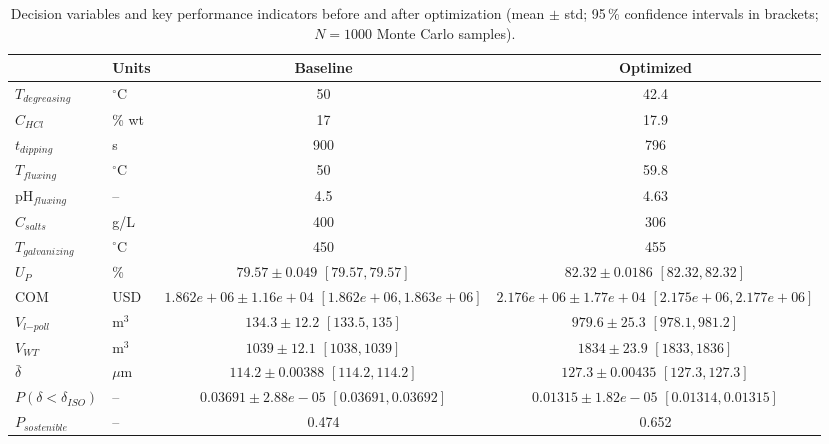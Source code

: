 \begin{table}[htbp]
\centering
\caption{Decision variables and key performance indicators before and after optimization (mean $\pm$ std; 95\,\% confidence intervals in brackets; $N = 1000$ Monte Carlo samples).}
\label{tab:summary}
\begin{tabular}{llcc}
\toprule
 & Units & Baseline & Optimized \\
\midrule
$T_{degreasing}$ & $^{\circ}$C & 50 & 42.4 \\
$C_{HCl}$ & \% wt & 17 & 17.9 \\
$t_{dipping}$ & s & 900 & 796 \\
$T_{fluxing}$ & $^{\circ}$C & 50 & 59.8 \\
pH$_{fluxing}$ & -- & 4.5 & 4.63 \\
$C_{salts}$ & g/L & 400 & 306 \\
$T_{galvanizing}$ & $^{\circ}$C & 450 & 455 \\
\midrule
$U_P$ & \% & $79.57 \pm 0.049$ $[79.57, 79.57]$ & $82.32 \pm 0.0186$ $[82.32, 82.32]$ \\
COM & USD & $1.862e+06 \pm 1.16e+04$ $[1.862e+06, 1.863e+06]$ & $2.176e+06 \pm 1.77e+04$ $[2.175e+06, 2.177e+06]$ \\
$V_{l\mathrm{-}poll}$ & m$^3$ & $134.3 \pm 12.2$ $[133.5, 135]$ & $979.6 \pm 25.3$ $[978.1, 981.2]$ \\
$V_{WT}$ & m$^3$ & $1039 \pm 12.1$ $[1038, 1039]$ & $1834 \pm 23.9$ $[1833, 1836]$ \\
$\bar{\delta}$ & $\mu$m & $114.2 \pm 0.00388$ $[114.2, 114.2]$ & $127.3 \pm 0.00435$ $[127.3, 127.3]$ \\
$P(\delta < \delta_{ISO})$ & -- & $0.03691 \pm 2.88e-05$ $[0.03691, 0.03692]$ & $0.01315 \pm 1.82e-05$ $[0.01314, 0.01315]$ \\
\midrule
$P_{sostenible}$ & -- & 0.474 & 0.652 \\
\bottomrule
\end{tabular}
\end{table}
